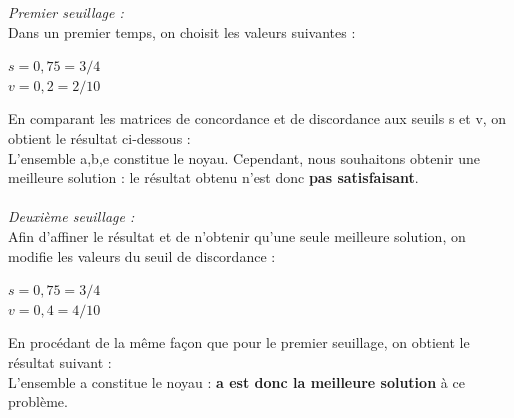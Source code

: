 \documentclass[a4paper, 11pt]{article}
\begin{document}
\emph{Premier seuillage :}\\
Dans un premier temps, on choisit les valeurs suivantes : 
\begin{center}
\textbf{$s = 0,75 = 3/4$\\
$v= 0,2 = 2/10$}
\end{center}
En comparant les matrices de concordance et de discordance aux seuils s et v, on obtient le résultat ci-dessous :\\
L’ensemble {a,b,e} constitue le noyau. Cependant, nous souhaitons obtenir une meilleure solution : le résultat obtenu n’est donc \textbf{pas satisfaisant}.\\\\

\emph{Deuxième seuillage :}\\
Afin d’affiner le résultat et de n’obtenir qu’une seule meilleure solution, on modifie les valeurs du seuil de discordance :\\
\begin{center}
\textbf{$s = 0,75 = 3/4$\\
$v= 0,4 = 4/10$}
\end{center}
En procédant de la même façon que pour le premier seuillage, on obtient le résultat suivant :\\
L’ensemble {a} constitue le noyau : \textbf{a est donc la meilleure solution} à ce problème.\\
\end{document}

